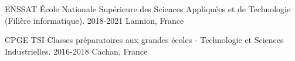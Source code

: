 
\begin{cveducation}

  \cvschool
    {ENSSAT} %
    {École Nationale Supérieure des Sciences Appliquées et de Technologie (Filière informatique).} %
    {} %
    {2018-2021} %
    {Lannion, France} %

  \cvschool
    {CPGE TSI} %
    {Classes préparatoires aux grandes écoles - Technologie 
    et Sciences Industrielles.} %
    {} %
    {2016-2018} %
    {Cachan, France} %
    
\end{cveducation}
